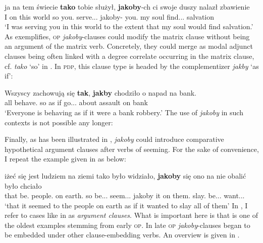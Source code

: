 \documentclass[output=paper]{langsci/langscibook}
\begin{document}
\ea \gll ja na tem świecie \textbf{tako} tobie służył, \textbf{jakoby}-ch ci swoje duszy nalazł zbawienie \label{adjunct-jakoby} \\
		I on this world so you.{\dat} serve.{\lptcp}.{\sg}.{\masc} jakoby-{\aor} you.{\dat} my soul find.{\lptcp}.{\sg}.{\masc} salvation \\
\glt	`I was serving you in this world to the extent that my soul would find salvation.' 
\z
As  exemplifies, \textsc{op} \emph{jakoby}-clauses could modify the matrix clause without being an argument of the matrix verb. Concretely, they could merge as modal adjunct clauses being often linked with a degree correlate occurring in the matrix clause, cf. \emph{tako} `so' in . In \textsc{pdp}, this clause type is headed by the complementizer \emph{jakby} `as if':

\ea \gll Wszyscy zachowują się \textbf{tak}, \textbf{jakby} chodziło o napad na bank. \\
		all behave.{\thirdperson}{\pl} {} so {as if} go.{\lptcp}.{\sg}.{\n} about assault on bank \\
\glt	`Everyone is behaving as if it were a bank robbery.' 
\z
The use of \emph{jakoby} in such contexts is not possible any longer:

\z
Finally, as has been illustrated in , \emph{jakoby} could introduce comparative hypothetical argument clauses after verbs of seeming. For the sake of convenience, I repeat the example given in  as  below:

\ea \gll iżeć się jest ludziem na ziemi tako było widziało, \textbf{jakoby} się ono na nie obalić było chciało \label{tee2} \\
			that {} be.{\thirdperson}{\sg} people.{\dat} on earth.{\LOC} so be.{\lptcp}.{\sg}.{\n} seem.{\lptcp}.{\sg}.{\n} jakoby {} it on them.{\acc} slay.{\infv} be.{\lptcp}.{\sg}.{\n} want.{\lptcp}.{\sg}.{\n} \\
\glt	`that it seemed to the people on earth as if it wanted to slay all of them' 
\z
In , I refer to cases like in   as \textit{argument clauses}. What is important here is that  is one of the oldest examples stemming from early \textsc{op}. In late \textsc{op} \emph{jakoby}-clauses began to be embedded under other clause-embedding verbs. An overview is given in .
\end{document}
